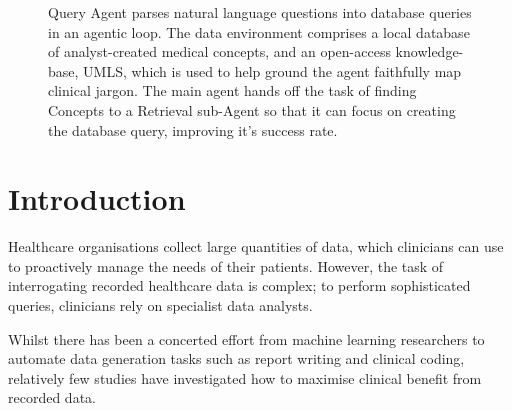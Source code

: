 \documentclass[11pt]{article}
\begin{document}
\begin{figure}[htbp]
\centering

\caption{
\colorbox{yellow!17}{Query Agent} parses natural language questions into database queries in an agentic loop. %
The data environment comprises a local database of analyst-created medical \colorbox{red!17}{concepts}, and an open-access knowledge-base, \colorbox{blue!10}{UMLS}, which is used to help ground the agent faithfully map clinical jargon.
The main agent hands off the task of finding Concepts to a \colorbox{teal!10}{Retrieval sub-Agent} so that it can focus on creating the database query, improving it's success rate.
}
\label{fig:question-to-query}

\end{figure}

\section{Introduction}

Healthcare organisations collect large quantities of data, which clinicians can use to proactively manage the needs of their patients. However, the task of interrogating recorded healthcare data is complex; to perform sophisticated queries, clinicians rely on specialist data analysts.

Whilst there has been a concerted effort from machine learning researchers to automate data generation tasks such as report writing and clinical coding, relatively few studies have investigated how to maximise clinical benefit from recorded data.


\end{document}
